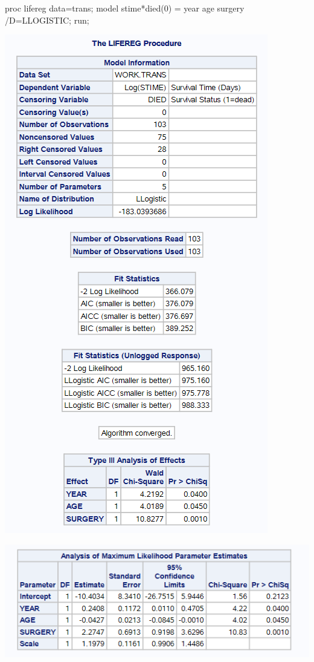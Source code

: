 \documentclass[
  12pt,
  letterpaper,
  DIV=11,
  numbers=noendperiod,
  onepage,
  openany]{scrreprt}
\newenvironment{Shaded}{\begin{snugshade}}{\end{snugshade}}
\newcommand{\DecValTok}[1]{\textcolor[rgb]{0.86,0.86,0.80}{#1}}
\newcommand{\FunctionTok}[1]{\textcolor[rgb]{0.94,0.94,0.56}{#1}}
\newcommand{\NormalTok}[1]{\textcolor[rgb]{0.80,0.80,0.80}{#1}}
\newcommand{\OtherTok}[1]{\textcolor[rgb]{0.94,0.94,0.56}{#1}}
\newcommand{\SpecialCharTok}[1]{\textcolor[rgb]{0.86,0.64,0.64}{#1}}
\begin{document}
\begin{Shaded}
\begin{Highlighting}[]
\NormalTok{proc lifereg data}\OtherTok{=}\NormalTok{trans;}
\NormalTok{model stime}\SpecialCharTok{*}\FunctionTok{died}\NormalTok{(}\DecValTok{0}\NormalTok{) }\OtherTok{=}\NormalTok{ year age surgery }\SpecialCharTok{/}\NormalTok{D}\OtherTok{=}\NormalTok{LLOGISTIC;}
\NormalTok{run;}
\end{Highlighting}
\end{Shaded}

\includegraphics{sas/8c.PNG}

\includegraphics{sas/8d.PNG}
\end{document}
